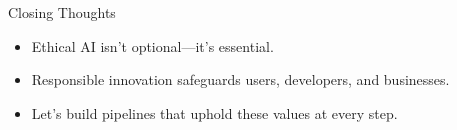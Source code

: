 \documentclass[aspectratio=169]{beamer}
\begin{document}
\begin{frame}{Closing Thoughts}
\begin{itemize}
\item Ethical AI isn’t optional—it’s essential.
\item Responsible innovation safeguards users, developers, and businesses.
\item Let’s build pipelines that uphold these values at every step.
\end{itemize}
\end{frame}
\end{document}
